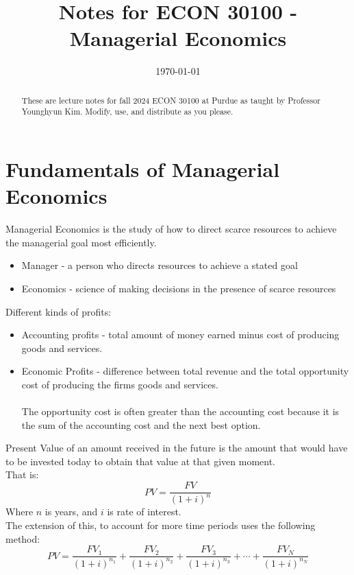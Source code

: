 \documentclass[nobib]{article}
\title{Notes for ECON 30100 - Managerial Economics}
\date{\today}  %
\begin{document}
\maketitle

\begin{abstract}
    These are lecture notes for fall 2024 ECON 30100 at Purdue as taught by Professor Younghyun Kim. Modify, use, and distribute as you please.
\end{abstract}

\tableofcontents

\newpage

\section{Fundamentals of Managerial Economics}
Managerial Economics is the study of how to direct scarce resources to achieve
the managerial goal most efficiently.
\begin{itemize}
    \item Manager - a person who directs resources to achieve a stated goal
    \item Economics - science of making decisions in the presence of scarce resources
\end{itemize}
Different kinds of profits:
\begin{itemize}
    \item Accounting profits - total amount of money earned minus cost of producing goods
          and services.
    \item Economic Profits - difference between total revenue and the total opportunity
          cost of producing the firms goods and services. \\~\\ The opportunity cost is
          often greater than the accounting cost because it is the sum of the accounting
          cost and the next best option.
\end{itemize}

Present Value of an amount received in the future is the amount that would have
to be invested today to obtain that value at that given moment.\\ That is:
\begin{equation*}
    PV = \frac{FV}{(1+i)^n}
\end{equation*}
Where $n$ is years, and $i$ is rate of interest.\\

The extension of this, to account for more time periods uses the following
method:
\begin{equation*}
    PV = \frac{FV_1}{(1+i)^{n_1}}+\frac{FV_2}{(1+i)^{n_2}}+\frac{FV_3}{(1+i)^{n_3}}+\cdots+\frac{FV_N}{(1+i)^{n_N}}
\end{equation*}
\end{document}
